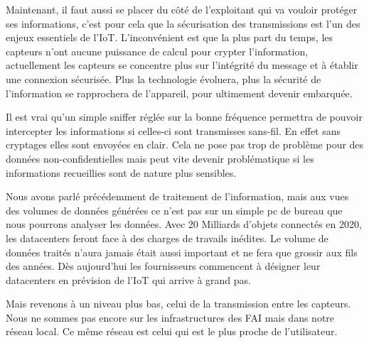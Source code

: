 
Maintenant, il faut aussi se placer du côté de l'exploitant qui va vouloir protéger ses informations, c'est pour cela que la sécurisation des transmissions est l'un des enjeux essentiels de l'IoT. L'inconvénient est que la plus part du temps, les capteurs n'ont aucune puissance de calcul pour crypter l'information, actuellement les capteurs se concentre plus sur l'intégrité du message et à établir une connexion sécurisée. Plus la technologie évoluera, plus la sécurité de l'information se rapprochera de l'appareil, pour ultimement devenir embarquée. 

Il est vrai qu'un simple sniffer réglée sur la bonne fréquence permettra de pouvoir intercepter les informations si celles-ci sont transmisses sans-fil. En effet sans cryptages elles sont envoyées en clair. Cela ne pose pas trop de problème pour des données non-confidentielles mais peut vite devenir problématique  si les informations recueillies sont de nature plus sensibles.


Nous avons parlé précédemment de traitement de l'information, mais aux vues des volumes de données générées ce n'est pas sur un simple pc de bureau que nous pourrons analyser les données. Avec 20 Milliards d'objets connectés en 2020, les datacenters feront face à des charges de travails inédites. Le volume de données traités n'aura jamais était aussi important et ne fera que grossir aux fils des années. Dès aujourd'hui les fournisseurs commencent à désigner leur datacenters en prévision de l'IoT qui arrive à grand pas.

Mais revenons à un niveau plus bas, celui de la transmission entre les capteurs. Nous ne sommes pas encore sur les infrastructures des FAI mais dans notre réseau local. Ce même réseau est celui qui est le plus proche de l'utilisateur. 
